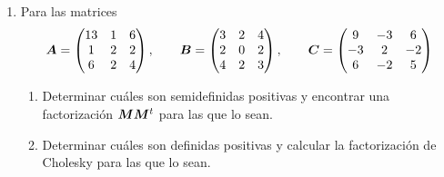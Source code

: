 \documentclass[11pt]{article}
\begin{document}
\begin{enumerate}[resume]
\item Para las matrices
$$
\bm{A} = \begin{pmatrix}
13 & 1 & 6 \\
 1 & 2 & 2 \\
 6 & 2 & 4
 \end{pmatrix},
\quad \quad
\bm{B} = \begin{pmatrix}
3 & 2 & 4 \\
2 & 0 & 2 \\
4 & 2 & 3
\end{pmatrix},
\quad \quad
\bm{C} = \begin{pmatrix}
 9 & -3 & 6 \\
 -3 &  2 & -2 \\
 6 & -2 & 5
 \end{pmatrix}
 $$
\begin{enumerate}
\item Determinar cuáles son semidefinidas positivas y encontrar una factorización $\bm{M} \bm{M}^t$ para las que lo sean.
\item Determinar cuáles son definidas positivas y calcular la factorización de Cholesky para las que lo sean.
\end{enumerate}

\end{enumerate}
\pagebreak
\end{document}
